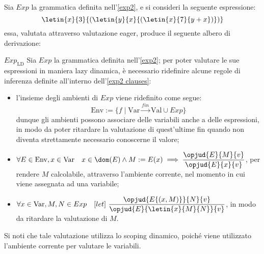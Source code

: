 \documentclass[a4paper, 12pt]{report}
\begin{document}
    \begin{example}
        \label{eager2}
        Sia $Exp$ la grammatica definita nell'\cref{exp2}, e si consideri la seguente espressione: $$\letin{x}{3}{(\letin{y}{x}{(\letin{x}{7}{y + x})})}$$ essa, valutata attraverso valutazione eager, produce il seguente albero di derivazione: 
    \end{example}

    \begin{framedobs}{$Exp_\mathrm{LD}$}
        Sia $Exp$ la grammatica definita nell'\cref{exp2}; per poter valutare le sue espressioni in maniera lazy dinamica, è necessario ridefinire alcune regole di inferenza definite all'interno dell'\cref{exp2 clauses}:

        \begin{itemize}
            \item l'insieme degli ambienti di $Exp$ viene ridefinito come segue: $$\mathrm{Env} := \{f \mid \mathrm{Var} \xrightarrow{fin} \mathrm{Val} \cup Exp\}$$ dunque gli ambienti possono associare delle variabili anche a delle espressioni, in modo da poter ritardare la valutazione di quest'ultime fin quando non diventa strettamente necessario conoscerne il valore;
            \item $\forall E \in \mathrm{Env}, x \in \mathrm{Var} \quad x \in \dom(E) \land M := E(x) \implies \dfrac{\opjud{E}{M}{v}}{\opjud{E}{x}{v}}$, per rendere $M$ calcolabile, attraverso l'ambiente corrente, nel momento in cui viene assegnata ad una variabile;
            \item $\forall x \in \mathrm{Var}, M, N \in Exp \quad [let] \ \dfrac{\opjud{E\{(x, M)\}}{N}{v}}{\opjud{E}{\letin{x}{M}{N}}{v}}$, in modo da ritardare la valutazione di $M$.
        \end{itemize}

        Si noti che tale valutazione utilizza lo scoping dinamico, poiché viene utilizzato l'ambiente corrente per valutare le variabili.
    \end{framedobs}
\end{document}
